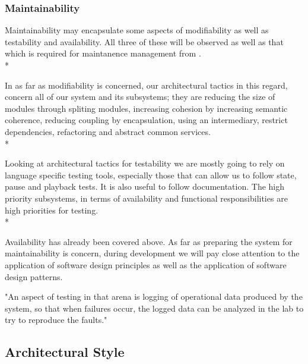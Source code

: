 \documentclass[11pt]{article}
\begin{document}

\subsubsection{Maintainability}

Maintainability may encapsulate some aspects of modifiability as well as testability and availability. All three of these will be observed as well as that which is required for maintanence management from \cite{Book:1}. \\*

In as far as modifiability is concerned, our architectural tactics in this regard, concern all of our system and its subsystems; they are reducing the size of modules through spliting modules, increasing cohesion by increasing semantic coherence, reducing coupling by encapsulation, using an intermediary, restrict dependencies, refactoring and abstract common services. \\*

Looking at architectural tactics for testability we are mostly going to rely on language specific testing tools, especially those that can allow us to follow state, pause and playback tests. It is also useful to follow documentation. The high priority subsystems, in terms of availability and functional responsibilities are high priorities for testing. \\*

Availability has already been covered above. As far as preparing the system for maintainability is concern, during development we will pay close attention to the application of software design principles as well as the application of software design patterns.

"An aspect of testing in that arena is logging of operational data produced by the system, so that when failures occur, the logged data can be analyzed in the lab to try to reproduce the faults."\cite{Book:2}

\subsection{Architectural Style}
\end{document}

